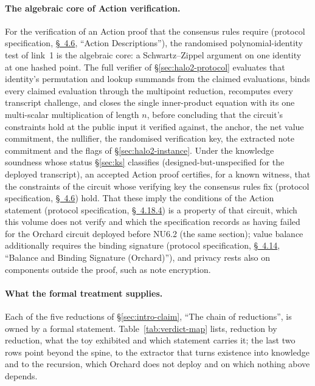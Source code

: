 \documentclass[11pt,a4paper]{article}
\theoremstyle{definition}
\begin{document}
\paragraph{The algebraic core of Action verification.}
For the verification of an Action proof that the consensus rules require
(protocol specification,
\href{https://zips.z.cash/protocol/protocol.pdf\#actiondesc}{\S~4.6},
``Action Descriptions''), the randomised polynomial-identity test of
link~1 is the algebraic core: a Schwartz--Zippel argument on one
identity at one hashed point. The full verifier of \S\ref{sec:halo2-protocol}
evaluates that identity's permutation and lookup summands from the claimed
evaluations, binds every claimed evaluation through the multipoint reduction,
recomputes every transcript challenge, and closes the single inner-product
equation with its one multi-scalar multiplication of length $n$, before
concluding that the circuit's constraints hold at the public input it verified
against, the anchor, the net value commitment, the nullifier, the randomised
verification key, the extracted note commitment and the flags of
\S\ref{sec:halo2-instance}.
Under the knowledge soundness whose status \S\ref{sec:ks} classifies
(designed-but-unspecified for the deployed transcript), an accepted
Action proof certifies, for a known witness, that the constraints of the
circuit whose verifying key the consensus rules fix (protocol
specification,
\href{https://zips.z.cash/protocol/protocol.pdf\#actiondesc}{\S~4.6})
hold. That these imply the conditions of the Action statement (protocol
specification,
\href{https://zips.z.cash/protocol/protocol.pdf\#actionstatement}{\S~4.18.4})
is a property of that circuit, which this volume does not verify and
which the specification records as having failed for the Orchard circuit
deployed before NU6.2 (the same section); value
balance additionally requires the binding signature (protocol
specification,
\href{https://zips.z.cash/protocol/protocol.pdf\#orchardbalance}{\S~4.14},
``Balance and Binding Signature (Orchard)''), and privacy rests also on
components outside the proof, such as note encryption.

\paragraph{What the formal treatment supplies.}
Each of the five reductions of \S\ref{sec:intro-claim}, ``The chain of
reductions'', is owned by a formal statement.
Table~\ref{tab:verdict-map} lists, reduction by reduction, what the toy
exhibited and which statement carries it; the last two rows point
beyond the spine, to the extractor that turns existence into knowledge
and to the recursion, which Orchard does not deploy and on which nothing
above depends.
\end{document}
